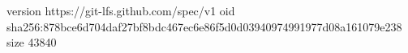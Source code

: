 version https://git-lfs.github.com/spec/v1
oid sha256:878bce6d704daf27bf8bdc467ec6e86f5d0d03940974991977d08a161079e238
size 43840
